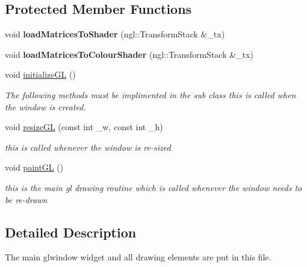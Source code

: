 \subsection*{Protected Member Functions}
\begin{DoxyCompactItemize}
\item 
\hypertarget{classGLWindow_ab78209ce50dd6820686aa05fc242eb7a}{
void {\bfseries loadMatricesToShader} (ngl::TransformStack \&\_\-tx)}
\label{classGLWindow_ab78209ce50dd6820686aa05fc242eb7a}

\item 
\hypertarget{classGLWindow_a508372a067e963cdf98d1ffd4efffbc5}{
void {\bfseries loadMatricesToColourShader} (ngl::TransformStack \&\_\-tx)}
\label{classGLWindow_a508372a067e963cdf98d1ffd4efffbc5}

\item 
void \hyperlink{classGLWindow_a39e39761cd7323806917a217cc7caea5}{initializeGL} ()
\begin{DoxyCompactList}\small\item\em The following methods must be implimented in the sub class this is called when the window is created. \end{DoxyCompactList}\item 
void \hyperlink{classGLWindow_abe57c0f40e59cba4c98759121e22eb47}{resizeGL} (const int \_\-w, const int \_\-h)
\begin{DoxyCompactList}\small\item\em this is called whenever the window is re-\/sized \end{DoxyCompactList}\item 
\hypertarget{classGLWindow_a9bd2503dd5f812c10a9481f22ecd3403}{
void \hyperlink{classGLWindow_a9bd2503dd5f812c10a9481f22ecd3403}{paintGL} ()}
\label{classGLWindow_a9bd2503dd5f812c10a9481f22ecd3403}

\begin{DoxyCompactList}\small\item\em this is the main gl drawing routine which is called whenever the window needs to be re-\/drawn \end{DoxyCompactList}\end{DoxyCompactItemize}


\subsection{Detailed Description}
The main glwindow widget and all drawing elements are put in this file. 

